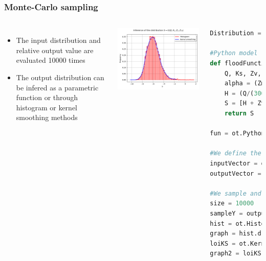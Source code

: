 \documentclass{beamer}
\begin{document}

\begin{frame}[containsverbatim]
\frametitle{Monte-Carlo sampling}

\scriptsize{

\begin{columns}

\begin{itemize}
\item The input distribution and relative output value are evaluated 10000 times
\item The output distribution can be infered as a parametric function or through histogram or kernel smoothing methods
\end{itemize}

    \includegraphics[width=1.\textwidth]{figures/S.png}

    
\tiny 
\begin{lstlisting}[language=Python, numbers = none]
Distribution = ot.JointDistribution([Q,Ks,Zv,Zm])

#Python model
def floodFunction(X):
    Q, Ks, Zv, Zm = X
    alpha = (Zm - Zv)/5.0e3
    H = (Q/(300.0*Ks*np.sqrt(alpha)))**0.6
    S = [H + Zv - 58.5]
    return S

fun = ot.PythonFunction(4,1,floodFunction)

#We define the output as a random vector
inputVector = ot.RandomVector(Distribution)
outputVector = ot.CompositeRandomVector(fun, inputVector)

#We sample and infere the output distribution
size = 10000
sampleY = outputVector.getSample(size)
hist = ot.HistogramFactory().build(sampleY)
graph = hist.drawPDF()
loiKS = ot.KernelSmoothing().build(sampleY)
graph2 = loiKS.drawPDF()

\end{lstlisting}

	
\end{columns}


}



\end{frame}
\end{document}
